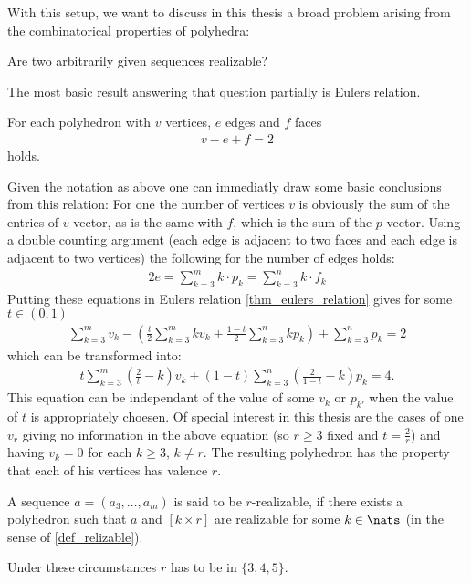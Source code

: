 With this setup, we want to discuss in this thesis a broad problem arising from the combinatorical properties of polyhedra:
\begin{problem} Are two arbitrarily given sequences realizable?
\end{problem}
The most basic result answering that question partially is Eulers relation.
\begin{theorem}\label{thm_eulers_relation}
  For each polyhedron with $v$ vertices, $e$ edges and $f$ faces
  \begin{align*}
    v - e + f = 2
  \end{align*}
  holds.
\end{theorem}
Given the notation as above one can immediatly draw some basic conclusions from this relation: For one the number of vertices $v$ is obviously the sum of the entries of $v$-vector, as is the same with $f$, which is the sum of the $p$-vector. Using a double counting argument (each edge is adjacent to two faces and each edge is adjacent to two vertices) the following for the number of edges holds:
\begin{align*}
  2e = \sum_{k=3}^{m} k \cdot p_k = \sum_{k=3}^{n} k \cdot f_k
\end{align*}
Putting these equations in Eulers relation \ref{thm_eulers_relation} gives for some $t \in (0, 1)$
\begin{align*}
  \sum_{k=3}^m v_k - \left(\frac{t}{2} \sum_{k=3}^m k v_k + \frac{1-t}{2} \sum_{k=3}^n k p_k \right) + \sum_{k=3}^n p_k = 2
\end{align*}
which can be transformed into:
\begin{align*}
  t \sum_{k=3}^m \left(\frac{2}{t} - k \right) v_k + (1-t) \sum_{k=3}^n \left( \frac{2}{1-t} - k \right) p_k = 4.
\end{align*}
This equation can be independant of the value of some $v_k$ or $p_{k'}$ when the value of $t$ is appropriately choesen. Of special interest in this thesis are the cases of one $v_r$ giving no information in the above equation (so $r \geq 3$ fixed and $t = \frac{2}{r}$) and having $v_{k} = 0$ for each $k \geq 3$, $k \neq r$. The resulting polyhedron has the property that each of his vertices has valence $r$. 
\begin{definition}[$r$-realizable]
  A sequence $a = (a_3, \dots, a_m)$ is said to be $r$-realizable, if there exists a polyhedron such that $a$ and $[k \times r]$ are realizable for some $k \in \nats$ (in the sense of \ref{def_relizable}).
\end{definition}
Under these circumstances $r$ has to be in $\{3, 4, 5\}$.

